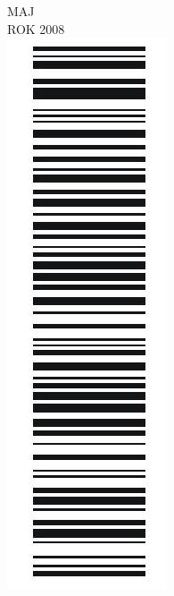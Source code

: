\documentclass[10pt]{article}
\begin{document}
MAJ\\
ROK 2008\\
\includegraphics[max width=\textwidth, center]{2024_11_21_2f72fc0c2faed8928619g-01(1)}
\end{document}

